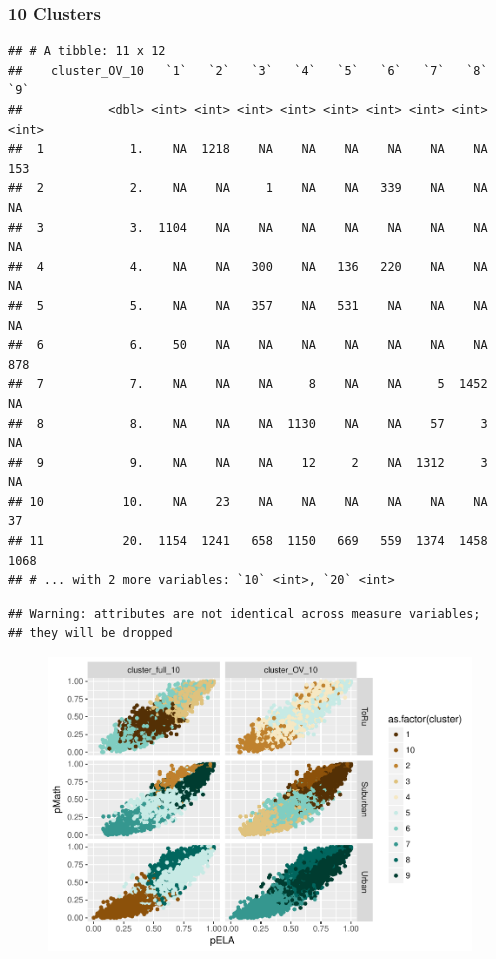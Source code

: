 \documentclass[floatsintext,man]{apa6}
\theoremstyle{definition}
\theoremstyle{definition}
\theoremstyle{definition}
\theoremstyle{remark}
\begin{document}
\subsubsection{10 Clusters}\label{clusters-1}

\begin{verbatim}
## # A tibble: 11 x 12
##    cluster_OV_10   `1`   `2`   `3`   `4`   `5`   `6`   `7`   `8`   `9`
##            <dbl> <int> <int> <int> <int> <int> <int> <int> <int> <int>
##  1            1.    NA  1218    NA    NA    NA    NA    NA    NA   153
##  2            2.    NA    NA     1    NA    NA   339    NA    NA    NA
##  3            3.  1104    NA    NA    NA    NA    NA    NA    NA    NA
##  4            4.    NA    NA   300    NA   136   220    NA    NA    NA
##  5            5.    NA    NA   357    NA   531    NA    NA    NA    NA
##  6            6.    50    NA    NA    NA    NA    NA    NA    NA   878
##  7            7.    NA    NA    NA     8    NA    NA     5  1452    NA
##  8            8.    NA    NA    NA  1130    NA    NA    57     3    NA
##  9            9.    NA    NA    NA    12     2    NA  1312     3    NA
## 10           10.    NA    23    NA    NA    NA    NA    NA    NA    37
## 11           20.  1154  1241   658  1150   669   559  1374  1458  1068
## # ... with 2 more variables: `10` <int>, `20` <int>
\end{verbatim}

\begin{verbatim}
## Warning: attributes are not identical across measure variables;
## they will be dropped
\end{verbatim}

\begin{figure}
\centering
\includegraphics{Method_files/figure-latex/unnamed-chunk-4-1.pdf}
\caption{}
\end{figure}
\end{document}
